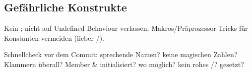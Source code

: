 \subsection{Gef\"ahrliche Konstrukte}
Kein ; nicht auf Undefined Behaviour verlassen; Makros/Pr\"aprozessor-Tricks f\"ur Konstanten vermeiden (lieber /).

\begin{tipp}
Schnellcheck vor dem Commit: sprechende Namen? keine magischen Zahlen? Klammern \"uberall? Member  \& initialisiert?  wo m\"oglich? kein rohes /?  gesetzt?
\end{tipp}
